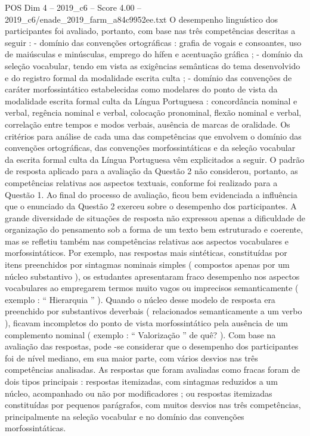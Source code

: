 \begin{textsample}{POS Dim 4 – 2019\_c6 – Score 4.00 – 2019\_c6/enade\_2019\_farm\_a84c9952ee.txt}
O desempenho linguístico dos participantes foi avaliado, portanto, com base nas três competências descritas a seguir : - domínio das convenções ortográficas : grafia de vogais e consoantes, uso de maiúsculas e minúsculas, emprego do hífen e acentuação gráfica ; - domínio da seleção vocabular, tendo em vista as exigências semânticas do tema desenvolvido e do registro formal da modalidade escrita culta ; - domínio das convenções de caráter morfossintático estabelecidas como modelares do ponto de vista da modalidade escrita formal culta da Língua Portuguesa : concordância nominal e verbal, regência nominal e verbal, colocação pronominal, flexão nominal e verbal, correlação entre tempos e modos verbais, ausência de marcas de oralidade.
Os critérios para análise de cada uma das competências que envolvem o domínio das convenções ortográficas, das convenções morfossintáticas e da seleção vocabular da escrita formal culta da Língua Portuguesa vêm explicitados a seguir.
O padrão de resposta aplicado para a avaliação da Questão 2 não considerou, portanto, as competências relativas aos aspectos textuais, conforme foi realizado para a Questão 1.
Ao final do processo de avaliação, ficou bem evidenciada a influência que o enunciado da Questão 2 exerceu sobre o desempenho dos participantes.
A grande diversidade de situações de resposta não expressou apenas a dificuldade de organização do pensamento sob a forma de um texto bem estruturado e coerente, mas se refletiu também nas competências relativas aos aspectos vocabulares e morfossintáticos.
Por exemplo, nas respostas mais sintéticas, constituídas por itens preenchidos por sintagmas nominais simples ( compostos apenas por um núcleo substantivo ), os estudantes apresentaram fraco desempenho nos aspectos vocabulares ao empregarem termos muito vagos ou imprecisos semanticamente ( exemplo : “ Hierarquia ” ).
Quando o núcleo desse modelo de resposta era preenchido por substantivos deverbais ( relacionados semanticamente a um verbo ), ficavam incompletos do ponto de vista morfossintático pela ausência de um complemento nominal ( exemplo : “ Valorização ” de quê? ).
Com base na avaliação das respostas, pode -se considerar que o desempenho dos participantes foi de nível mediano, em sua maior parte, com vários desvios nas três competências analisadas.
As respostas que foram avaliadas como fracas foram de dois tipos principais : respostas itemizadas, com sintagmas reduzidos a um núcleo, acompanhado ou não por modificadores ; ou respostas itemizadas constituídas por pequenos parágrafos, com muitos desvios nas três competências, principalmente na seleção vocabular e no domínio das convenções morfossintáticas.

\end{textsample}
